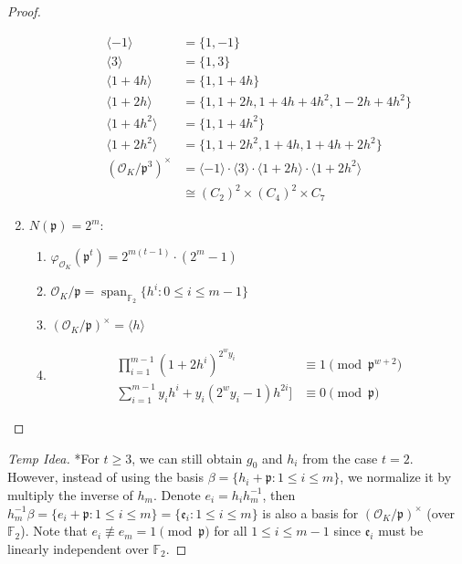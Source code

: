 \documentclass{treatise}
\begin{document}
\begin{shaded}
\begin{proof}
\begin{enumerate}
\begin{enumerate}
\begin{align*}
		\langle -1 \rangle & = \{ 1, -1 \} \\
		\langle 3 \rangle & = \{ 1, 3 \} \\
		\langle 1 + 4h \rangle & = \{ 1, 1 + 4h \} \\
		\langle 1 + 2h \rangle & = \{ 1, 1 + 2h, 1 + 4h + 4h^2, 1 - 2h + 4h^2 \} \\
		\langle 1 + 4h^2 \rangle & = \{ 1, 1 + 4h^2 \} \\
		\langle 1 + 2h^2 \rangle & = \{ 1, 1 + 2h^2, 1 + 4h, 1 + 4h + 2h^2 \} \\
		(\mathcal{O}_K / \mathfrak{p}^3)^\times & = \langle -1 \rangle \cdot \langle 3 \rangle \cdot  \langle 1 + 2h \rangle \cdot \langle 1 + 2h^2 \rangle \\
		& \cong (C_2)^2 \times (C_4)^2 \times C_7
		\end{align*}
	\end{enumerate}
	\item $N(\mathfrak{p}) = 2^m$:
	\begin{enumerate}
		\item $\varphi_{\mathcal{O}_K}(\mathfrak{p}^t) = 2^{m(t - 1)} \cdot (2^m - 1)$
		\item $\mathcal{O}_K / \mathfrak{p} = \operatorname{span}_{\mathbb{F}_2} \{ h^i : 0 \leq i \leq m - 1 \} $
		\item $(\mathcal{O}_K / \mathfrak{p})^\times = \langle h \rangle$
		\item
		\begin{align*}
		\prod_{i = 1}^{m - 1} (1 + 2 h^i)^{2^w y_i} & \equiv 1 \pmod{\mathfrak{p}^{w + 2}} \\
		\sum_{i = 1}^{m - 1} y_i h^i + y_i (2^w y_i - 1) h^{2i}] & \equiv 0 \pmod{\mathfrak{p}}
		\end{align*}
	\end{enumerate}
\end{enumerate}
\end{proof}
\begin{proof}[Temp Idea]
*For $t \geq 3$, we can still obtain $g_0$ and $h_i$ from the case $t = 2$. However, instead of using the basis $\beta = \{ h_i + \mathfrak{p} : 1 \leq i \leq m \}$, we normalize it by multiply the inverse of $h_m$. Denote $e_i = h_i h_m^{-1}$, then $h_m^{-1} \beta = \{ e_i + \mathfrak{p} : 1 \leq i \leq m \} = \{ \mathfrak{e}_i : 1 \leq i \leq m \}$ is also a basis for $(\mathcal{O}_K / \mathfrak{p})^\times$ (over $\mathbb{F}_2$). Note that $e_i \not\equiv e_m = 1 \pmod{\mathfrak{p}}$ for all $1 \leq i \leq m - 1$ since $\mathfrak{e}_i$ must be linearly independent over $\mathbb{F}_2$.

\end{proof}
\end{shaded}
\end{document}

